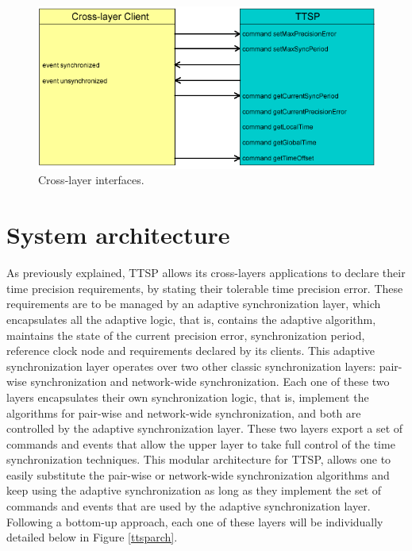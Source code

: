 \begin{figure}[!htb]
\begin{center}
\includegraphics[scale=0.5]{./images/06-ttsp-crosslayer.png}
\end{center}
\caption{Cross-layer interfaces.}
\label{crosslayer}
\end{figure}

\section{System architecture}

As previously explained, TTSP allows its cross-layers applications to declare their time precision requirements, by stating their tolerable time precision error. These requirements are to be managed by an adaptive synchronization layer, which encapsulates all the adaptive logic, that is, contains the adaptive algorithm, maintains the state of the current precision error, synchronization period, reference clock node and requirements declared by its clients. This adaptive synchronization layer operates over two other classic synchronization layers: pair-wise synchronization and network-wide synchronization. Each one of these two layers encapsulates their own synchronization logic, that is, implement the algorithms for pair-wise and network-wide synchronization, and both are controlled by the adaptive synchronization layer. These two layers export a set of commands and events that allow the upper layer to take full control of the time synchronization techniques. This modular architecture for TTSP, allows one to easily substitute the pair-wise or network-wide synchronization algorithms and keep using the adaptive synchronization as long as they implement the set of commands and events that are used by the adaptive synchronization layer. Following a bottom-up approach, each one of these layers will be individually detailed below in Figure \ref{ttsparch}.

